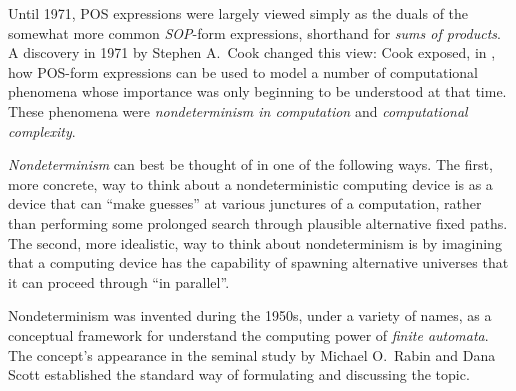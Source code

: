 {\bigskip


Until 1971, POS expressions were largely viewed simply as the duals of the somewhat more common {\it SOP}-form expressions, shorthand for {\it sums of products}.   A discovery in 1971 by Stephen A.~Cook changed this view: Cook exposed, in \cite{Cook71}, how POS-form expressions can be used to model a number of computational phenomena whose importance
was only beginning to be understood at that time.  These phenomena were {\it nondeterminism in computation} and {\it computational complexity}.

\medskip

{\it Nondeterminism} can best be thought of in one of the following ways.  The first, more concrete, way to think about a nondeterministic computing device is as a device that can ``make guesses'' at various junctures of a computation, rather than performing some prolonged search through plausible alternative fixed paths.  The second, more idealistic, way to think about nondeterminism is by imagining that a computing device has the capability of spawning alternative universes that it can proceed through ``in parallel''.

\bigskip

\noindent {}
\bigskip

   
 
\noindent 
Nondeterminism was invented during the 1950s, under a variety of names, as a conceptual framework for understand the computing power of {\it finite automata}.  The concept's
appearance in the seminal study \cite{RabinS59} by Michael O.~Rabin and Dana Scott
established the standard way of formulating and discussing the topic.

\medskip

}
